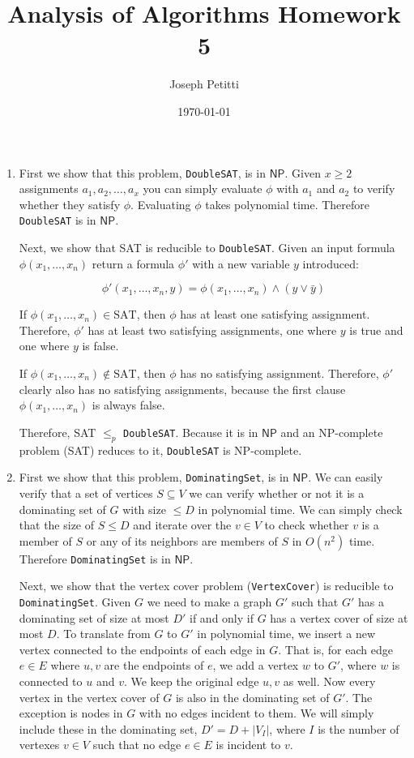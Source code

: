 \documentclass[a4paper, 10pt]{article}
\title{Analysis of Algorithms Homework 5}
\author{Joseph Petitti}
\date{\today}
\begin{document}
\maketitle

\begin{enumerate}
	\item First we show that this problem, \texttt{DoubleSAT}, is in
		$\mathsf{NP}$. Given $x \ge 2$ assignments $a_1, a_2, \dots , a_x$ you
		can simply evaluate $\phi$ with $a_1$ and $a_2$ to verify whether they
		satisfy $\phi$. Evaluating $\phi$ takes polynomial time. Therefore
		\texttt{DoubleSAT} is in $\mathsf{NP}$.

		Next, we show that SAT is reducible to \texttt{DoubleSAT}. Given an
		input formula $\phi(x_1, \dots, x_n)$ return a formula $\phi'$ with a
		new variable $y$ introduced:

		$$\phi'(x_1, \dots, x_n, y) = \phi(x_1, \dots, x_n) \land (y \lor \bar
		y)$$ 

		If $\phi(x_1, \dots, x_n) \in \mathrm{SAT}$, then $\phi$ has at least
		one satisfying assignment. Therefore, $\phi'$ has at least two
		satisfying assignments, one where $y$ is true and one where $y$ is
		false.

		If $\phi(x_1, \dots, x_n) \notin \mathrm{SAT}$, then $\phi$ has no
		satisfying assignment. Therefore, $\phi'$ clearly also has no
		satisfying assignments, because the first clause $\phi(x_1, \dots, x_n)$
		is always false.

		Therefore, SAT $\le_p$ \texttt{DoubleSAT}. Because it is in
		$\mathsf{NP}$ and an NP-complete problem (SAT) reduces to it,
		\texttt{DoubleSAT} is NP-complete.

	\item First we show that this problem, \texttt{DominatingSet}, is in
		$\mathsf{NP}$. We can easily verify that a set of vertices $S \subseteq
		V$ we can verify whether or not it is a dominating set of $G$ with size
		$\le D$ in polynomial time. We can simply check that the size of $S \le
		D$ and iterate over the $v \in V$ to check whether $v$ is a member of
		$S$ or any of its neighbors are members of $S$ in $O(n^2)$ time.
		Therefore \texttt{DominatingSet} is in $\mathsf{NP}$.

		Next, we show that the vertex cover problem (\texttt{VertexCover}) is
		reducible to \texttt{DominatingSet}.  Given $G$ we need to make a graph
		$G'$ such that $G'$ has a dominating set of size at most $D'$ if and
		only if $G$ has a vertex cover of size at most $D$. To translate from
		$G$ to $G'$ in polynomial time, we insert a new vertex connected to the
		endpoints of each edge in $G$. That is, for each edge $e \in E$ where
		$u, v$ are the endpoints of $e$, we add a vertex $w$ to $G'$, where $w$
		is connected to $u$ and $v$. We keep the original edge $u, v$ as well.
		Now every vertex in the vertex cover of $G$ is also in the dominating
		set of $G'$. The exception is nodes in $G$ with no edges incident to
		them. We will simply include these in the dominating set, $D' = D +
		|V_I|$, where $I$ is the number of vertexes $v \in V$ such that no edge
		$e \in E$ is incident to $v$.


\end{enumerate}
\end{document}
